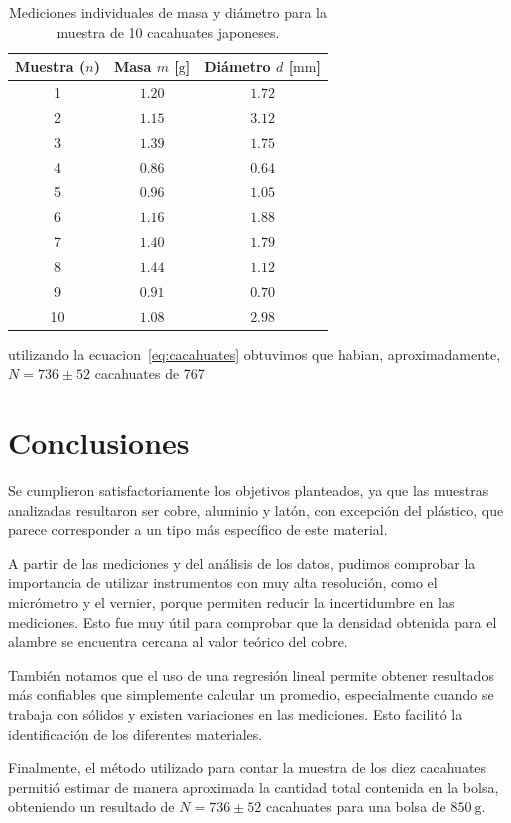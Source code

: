 \documentclass[10pt, letterpaper, twocolumn]{article}
\begin{document}
\begin{table}[htbp]
    \centering
    \caption{Mediciones individuales de masa y diámetro para la muestra de 10 cacahuates japoneses.}
    \label{tab:cacahuates}
    \begin{tabular}{ccc}
        \toprule
        \textbf{Muestra ($n$)} & \textbf{Masa $m$ [$\mathrm{g}$]} & \textbf{Diámetro $d$ [$\mathrm{mm}$]} \\
        \midrule
        1  & $1.20$ & $1.72$ \\
        2  & $1.15$ & $3.12$ \\
        3  & $1.39$ & $1.75$ \\
        4  & $0.86$ & $0.64$ \\
        5  & $0.96$ & $1.05$ \\
        6  & $1.16$ & $1.88$ \\
        7  & $1.40$ & $1.79$ \\
        8  & $1.44$ & $1.12$ \\
        9  & $0.91$ & $0.70$ \\
        10 & $1.08$ & $2.98$ \\
        \bottomrule
    \end{tabular}
\end{table}
utilizando la ecuacion~\ref{eq:cacahuates} obtuvimos que habian, aproximadamente, $N=736 \pm 52$ cacahuates de 767
\section{Conclusiones}
Se cumplieron satisfactoriamente los objetivos planteados, ya que las muestras analizadas resultaron ser cobre, aluminio y latón, con excepción del plástico, que parece corresponder a un tipo más específico de este material.

A partir de las mediciones y del análisis de los datos, pudimos comprobar la importancia de utilizar instrumentos con muy alta resolución, como el micrómetro y el vernier, porque permiten reducir la incertidumbre en las mediciones. Esto fue muy útil para comprobar que la densidad obtenida para el alambre se encuentra cercana al valor teórico del cobre.

También notamos que el uso de una regresión lineal permite obtener resultados más confiables que simplemente calcular un promedio, especialmente cuando se trabaja con sólidos y existen variaciones en las mediciones. Esto facilitó la identificación de los diferentes materiales.

Finalmente, el método utilizado para contar la muestra de los diez cacahuates permitió estimar de manera aproximada la cantidad total contenida en la bolsa, obteniendo un resultado de $N = 736 \pm 52$ cacahuates para una bolsa de $850\ \mathrm{g}$.
\end{document}
